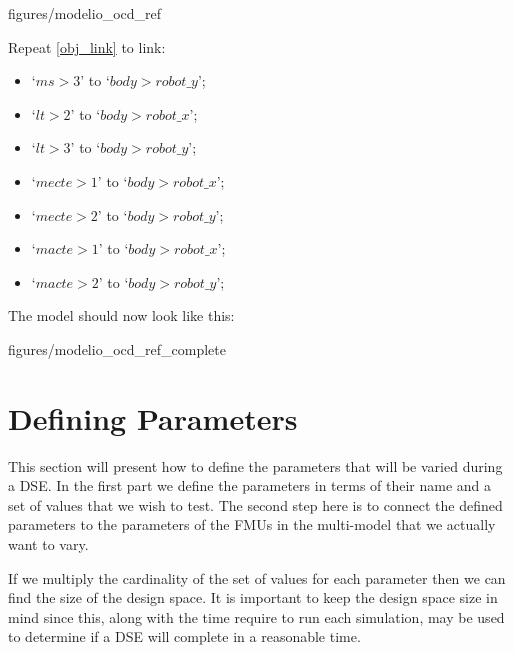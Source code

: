 \documentclass[11pt,a4paper]{../tutorial}
\begin{document}
\begin{instructions}
\begin{center}
\begin{annotation}[width=0.7\linewidth]{figures/modelio_ocd_ref}
    \end{annotation}
\end{center}

\newpage

\item Repeat \ref{obj_link} to link:
\begin{itemize}
	\item `$ms > 3$' to `$body > robot\_y$';
	\item `$lt > 2$' to `$body > robot\_x$';
	\item `$lt > 3$' to `$body > robot\_y$';
	\item `$mecte > 1$' to `$body > robot\_x$';
	\item `$mecte > 2$' to `$body > robot\_y$';
	\item `$macte > 1$' to `$body > robot\_x$';
	\item `$macte > 2$' to `$body > robot\_y$';
\end{itemize}

The model should now look like this:

\begin{center}
\begin{annotation}[width=0.7\linewidth]{figures/modelio_ocd_ref_complete}
    \end{annotation}
\end{center}

\end{instructions}


\newpage
\section{Defining Parameters}

This section will present how to define the parameters that will be varied during a DSE.  In the first part we define the parameters in terms of their name and a set of values that we wish to test. The second step here is to connect the defined parameters to the parameters of the FMUs in the multi-model that we actually want to vary.

If we multiply the cardinality of the set of values for each parameter then we can find the size of the design space.  It is important to keep the design space size in mind since this, along with the time require to run each simulation, may be used to determine if a DSE will complete in a reasonable time.
\end{document}
